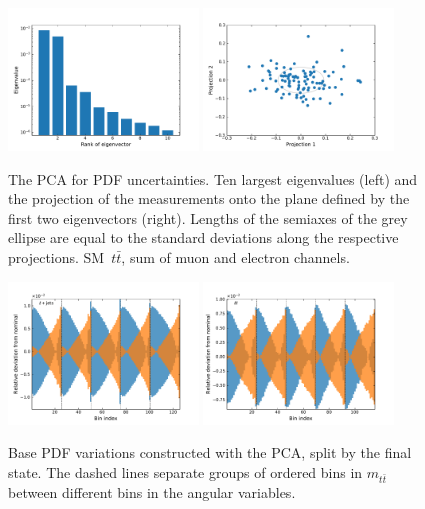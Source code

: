\begin{figure}
  \centering
  \includegraphics[width=0.45\textwidth]{fig/chapt7/syst/PDF/eigenvalues.pdf}
  \includegraphics[width=0.45\textwidth]{fig/chapt7/syst/PDF/projection12.pdf}
  \caption{The PCA for PDF uncertainties. Ten largest eigenvalues (left) and the projection of the measurements onto the plane defined by the first two eigenvectors (right). Lengths of the semiaxes of the grey ellipse are equal to the standard deviations along the respective projections. SM~$t\bar t$, sum of muon and electron channels.}
  \label{Fig:PDFPCA}
\end{figure}

\begin{figure}
  \centering
  \includegraphics[width=0.45\textwidth]{fig/chapt7/syst/PDF/baseTemplates_ljets.pdf}
  \includegraphics[width=0.45\textwidth]{fig/chapt7/syst/PDF/baseTemplates_dilep.pdf}
  \caption{Base PDF variations constructed with the PCA, split by the final state. The dashed lines separate groups of ordered bins in $m_{t\bar t}$ between different bins in the angular variables.}
  \label{Fig:BasePDFVars}
\end{figure}

